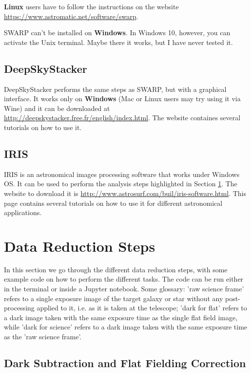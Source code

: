 \documentclass[a4paper, 11pt, fleqn]{memoir}
\begin{document}
\textbf{Linux} users have to follow the instructions on the website \url{https://www.astromatic.net/software/swarp}.

SWARP can't be installed on \textbf{Windows}.
In Windows 10, however, you can activate the Unix terminal.
Maybe there it works, but I have never tested it.

\subsection{DeepSkyStacker}

DeepSkyStacker performs the same steps as SWARP, but with a graphical interface.
It works only on \textbf{Windows} (Mac or Linux users may try using it via Wine) and it can be downloaded at \url{http://deepskystacker.free.fr/english/index.html}.
The website containes several tutorials on how to use it.

\subsection{IRIS}

IRIS is an astronomical images processing software that works under Windows OS.
It can be used to perform the analysis steps highlighted in Section \ref{section:data_red_steps}.
The website to download it is \url{http://www.astrosurf.com/buil/iris-software.html}.
This page contains several tutorials on how to use it for different astronomical applications.

\section{Data Reduction Steps}
\label{section:data_red_steps}

In this section we go through the different data reduction steps, with some example code on how to perform the different tasks.
The code can be run either in the terminal or inside a Jupyter notebook.
Some glossary: 'raw science frame' refers to a single exposure image of the target galaxy or star without any post-processing applied to it, i.e. as it is taken at the telescope; 'dark for flat' refers to a dark image taken with the same exposure time as the single flat field image, while 'dark for science' refers to a dark image taken with the same exposure time as the 'raw science frame'.

\subsection{Dark Subtraction and Flat Fielding Correction}
\end{document}

